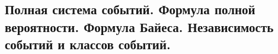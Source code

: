 \subsection{Полная система событий. Формула полной вероятности. Формула Байеса. Независимость событий и классов событий.}
